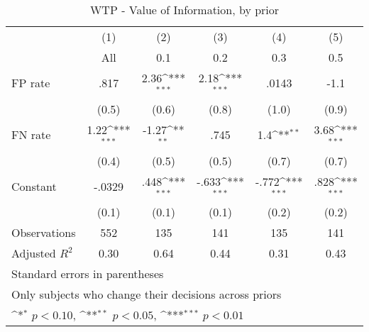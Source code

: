 \begin{table}[htbp]\centering
\def\sym#1{\ifmmode^{#1}\else\(^{#1}\)\fi}
\caption{WTP - Value of Information, by prior}
\begin{tabular}{l*{5}{c}}
\hline\hline
                &\multicolumn{1}{c}{(1)}&\multicolumn{1}{c}{(2)}&\multicolumn{1}{c}{(3)}&\multicolumn{1}{c}{(4)}&\multicolumn{1}{c}{(5)}\\
                &\multicolumn{1}{c}{All}&\multicolumn{1}{c}{0.1}&\multicolumn{1}{c}{0.2}&\multicolumn{1}{c}{0.3}&\multicolumn{1}{c}{0.5}\\
\hline
FP rate         &     .817         &     2.36\sym{***}&     2.18\sym{***}&    .0143         &     -1.1         \\
                &    (0.5)         &    (0.6)         &    (0.8)         &    (1.0)         &    (0.9)         \\
FN rate         &     1.22\sym{***}&    -1.27\sym{**} &     .745         &      1.4\sym{**} &     3.68\sym{***}\\
                &    (0.4)         &    (0.5)         &    (0.5)         &    (0.7)         &    (0.7)         \\
Constant        &   -.0329         &     .448\sym{***}&    -.633\sym{***}&    -.772\sym{***}&     .828\sym{***}\\
                &    (0.1)         &    (0.1)         &    (0.1)         &    (0.2)         &    (0.2)         \\
\hline
Observations    &      552         &      135         &      141         &      135         &      141         \\
Adjusted \(R^{2}\)&     0.30         &     0.64         &     0.44         &     0.31         &     0.43         \\
\hline\hline
\multicolumn{6}{l}{\footnotesize Standard errors in parentheses}\\
\multicolumn{6}{l}{\footnotesize Only subjects who change their decisions across priors}\\
\multicolumn{6}{l}{\footnotesize \sym{*} \(p<0.10\), \sym{**} \(p<0.05\), \sym{***} \(p<0.01\)}\\
\end{tabular}
\end{table}
